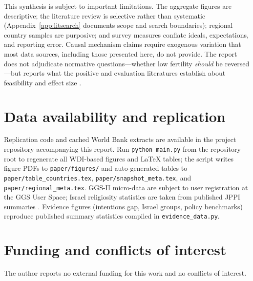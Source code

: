\documentclass[11pt,a4paper,openany]{book}
\begin{document}
This synthesis is subject to important limitations. The aggregate figures are descriptive; the literature review is selective rather than systematic (Appendix~\ref{app:litsearch} documents scope and search boundaries); regional country samples are purposive; and survey measures conflate ideals, expectations, and reporting error. Causal mechanism claims require exogenous variation that most data sources, including those presented here, do not provide. The report does not adjudicate normative questions---whether low fertility \emph{should} be reversed---but reports what the positive and evaluation literatures establish about feasibility and effect size \citep{morgan2003,doepke2023}.

\appendix


\chapter{Data availability and replication}
\label{app:replication}

\noindent
Replication code and cached World Bank extracts are available in the project repository accompanying this report. Run \texttt{python main.py} from the repository root to regenerate all WDI-based figures and \LaTeX{} tables; the script writes figure PDFs to \texttt{paper/figures/} and auto-generated tables to \texttt{paper/table\_countries.tex}, \texttt{paper/snapshot\_meta.tex}, and \texttt{paper/regional\_meta.tex}. GGS-II micro-data are subject to user registration at the GGS User Space; Israel religiosity statistics are taken from published JPPI summaries \citep{jppi2023}. Evidence figures (intentions gap, Israel groups, policy benchmarks) reproduce published summary statistics compiled in \texttt{evidence\_data.py}.

\chapter{Funding and conflicts of interest}
\noindent
The author reports no external funding for this work and no conflicts of interest.

\backmatter
\clearpage
{}

\end{document}
